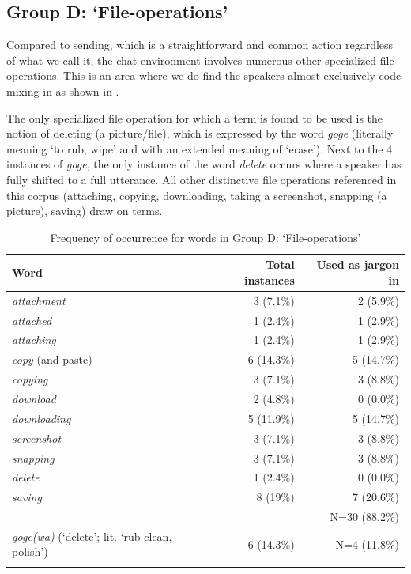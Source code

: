 \documentclass[output=paper
,newtxmath
,modfonts
,nonflat]{langsci/langscibook}
\begin{document}
\subsection{Group D: ‘File-operations’}

Compared to sending, which is a straightforward and common action regardless of what we call it, the chat environment involves numerous other specialized file operations. This is an area where we do find the  speakers almost exclusively code-mixing in  as shown in .  

The only specialized file operation for which a  term is found to be used is the notion of deleting (a picture/file), which is expressed by the word \textit{goge} (literally meaning ‘to rub, wipe’ and with an extended meaning of ‘erase’). Next to the 4 instances of \textit{goge}, the only instance of the  word \textit{delete} occurs where a speaker has fully shifted to a full  utterance. All other distinctive file operations referenced in this corpus (attaching, copying, downloading, taking a screenshot, snapping (a picture), saving) draw on  terms.

\begin{table}
\begin{tabularx}{\textwidth}{Qrr}
\lsptoprule
Word & Total instances & Used as jargon in \\
\midrule
\textit{attachment}       & 3 (7.1\%) & 2 (5.9\%)\\
\textit{attached}         & 1 (2.4\%) & 1 (2.9\%)\\
\textit{attaching}        & 1 (2.4\%) & 1 (2.9\%)\\
\textit{copy} (and paste) & 6 (14.3\%) & 5 (14.7\%)\\
\textit{copying}          & 3 (7.1\%) & 3 (8.8\%)\\
\textit{download}         & 2 (4.8\%) & 0 (0.0\%)\\
\textit{downloading}      & 5 (11.9\%) & 5 (14.7\%)\\
\textit{screenshot}       & 3 (7.1\%) & 3 (8.8\%)\\
\textit{snapping}         & 3 (7.1\%) & 3 (8.8\%)\\
\textit{delete}           & 1 (2.4\%) & 0 (0.0\%)\\
\textit{saving}           & 8 (19\%) & 7 (20.6\%)\\\midrule
& & N=30 (88.2\%)\\\midrule
\textit{goge(wa)} (‘delete’; lit. ‘rub clean, polish’) & 6 (14.3\%) & N=4 (11.8\%)\\
\lspbottomrule
\end{tabularx}
\caption{Frequency of occurrence for words in Group D: ‘File-operations’}
\label{tab:purvis:6}
\end{table} 
\end{document}

